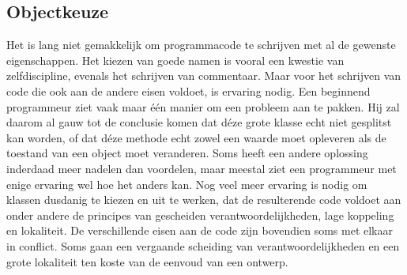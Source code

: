 \documentclass{article}
\begin{document}
	\subsection{Objectkeuze}
	
	Het is lang niet gemakkelijk om programmacode te schrijven met al de
	gewenste eigenschappen. Het kiezen van goede namen is vooral een
	kwestie van zelfdiscipline, evenals het schrijven van commentaar. Maar
	voor het schrijven van code die ook aan de andere eisen voldoet, is
	ervaring nodig. Een beginnend programmeur ziet vaak maar één manier
	om een probleem aan te pakken. Hij zal daarom al gauw tot de conclusie
	komen dat déze grote klasse echt niet gesplitst kan worden, of dat déze
	methode echt zowel een waarde moet opleveren als de toestand van een
	object moet veranderen. Soms heeft een andere oplossing inderdaad
	meer nadelen dan voordelen, maar meestal ziet een programmeur met
	enige ervaring wel hoe het anders kan. Nog veel meer ervaring is nodig
	om klassen dusdanig te kiezen en uit te werken, dat de resulterende code
	voldoet aan onder andere de principes van gescheiden
	verantwoordelijkheden, lage koppeling en lokaliteit.
	De verschillende eisen aan de code zijn bovendien soms met elkaar in
	conflict. Soms gaan een vergaande scheiding van verantwoordelijkheden
	en een grote lokaliteit ten koste van de eenvoud van een ontwerp.
	
\end{document}
